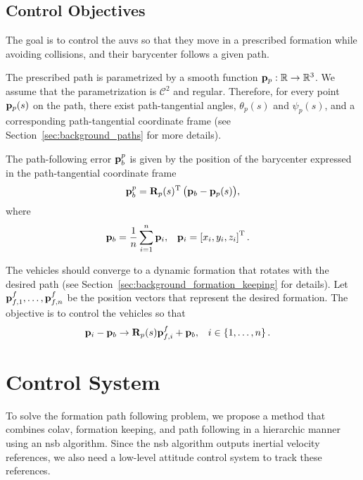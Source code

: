 \subsection{Control Objectives}
\label{sec:nsb_5dof_objectives}
The goal is to control the \glspl{auv} so that they move in a prescribed formation while avoiding collisions, and their barycenter follows a given path.

The prescribed path is parametrized by a smooth function $\mathbf{p}_p: \mathbb{R} \rightarrow \mathbb{R}^3$.
We assume that the parametrization is $\mathcal{C}^2$ and regular.
Therefore, for every point $\mathbf{p}_p(s)$ on the path, there exist path-tangential angles, $\theta_p(s)$ and $\psi_p(s)$, and a corresponding path-tangential coordinate frame (see Section~\ref{sec:background_paths} for more details).

The path-following error $\mathbf{p}_b^p$ is given by the position of the barycenter expressed in the path-tangential coordinate frame
\begin{equation}
    \mathbf{p}_b^p = \mathbf{R}_p(s)^{\mathrm{T}} \, \big(\mathbf{p}_b - \mathbf{p}_p(s)\big), \label{eq:nsb_5dof_barycenter}
\end{equation}
where
\begin{align}
    \mathbf{p}_b &= \frac{1}{n} \sum_{i=1}^n \mathbf{p}_i, & 
    \mathbf{p}_i &= \left[x_i, y_i, z_i\right]^{\mathrm{T}}.
\end{align}

The vehicles should converge to a dynamic formation that rotates with the desired path (see Section~\ref{sec:background_formation_keeping} for details).
Let $\mathbf{p}_{f,1}^f, \ldots, \mathbf{p}_{f,n}^f$ be the position vectors that represent the desired formation.
The objective is to control the vehicles so that
\begin{align}
    \mathbf{p}_i - \mathbf{p}_b &\rightarrow \mathbf{R}_p(s) \mathbf{p}_{f,i}^f + \mathbf{p}_b, &
    i &\in \left\{1, \ldots, n \right\}.
\end{align}

\section{Control System}
\label{sec:nsb_5dof_control}
To solve the formation path following problem, we propose a method that combines \acrfull{colav}, formation keeping, and path following in a hierarchic manner using an \gls{nsb} algorithm.
Since the \gls{nsb} algorithm outputs inertial velocity references, we also need a low-level attitude control system to track these references.

